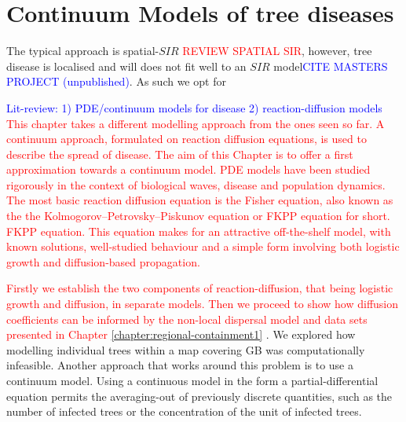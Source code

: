 


\chapter{Continuum Models of tree diseases}
The typical approach is spatial-$SIR$ \textcolor{red}{REVIEW SPATIAL SIR}, however, tree disease is localised and will does not fit well to an $SIR$ model\textcolor{blue}{CITE MASTERS PROJECT (unpublished)}. %
As such we opt for 

\textcolor{blue}{Lit-review: 1) PDE/continuum models for disease 2) reaction-diffusion models}
\textcolor{red}{This chapter takes a different modelling approach from the ones seen so far. %
A continuum approach, formulated on reaction diffusion equations, is used to describe the spread of disease. %
The aim of this Chapter is to offer a first approximation towards a continuum model. %
PDE models have been  studied rigorously in the context of biological waves, disease and population dynamics. %
The most basic reaction diffusion equation is the Fisher equation, also known as the the Kolmogorov–Petrovsky–Piskunov equation or FKPP equation for short. %
FKPP equation. This equation makes for an attractive off-the-shelf model, with known solutions, well-studied behaviour and a simple form involving both logistic growth and diffusion-based propagation.}                                                


\textcolor{red}{Firstly we establish the two components of reaction-diffusion, that being logistic growth and diffusion, in separate models. Then we proceed to show how diffusion coefficients can be informed by the non-local dispersal model and data sets presented in Chapter \ref{chapter:regional-containment1} }. We explored how modelling individual trees within a map covering GB  was computationally infeasible. Another approach that works around this problem is to use a continuum model. Using a continuous model in the form a partial-differential equation permits the averaging-out of previously discrete quantities, such as the number of infected trees or the concentration of the unit of infected  trees.

